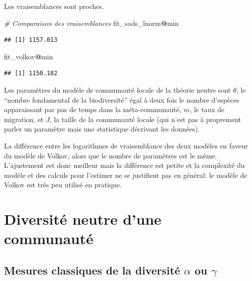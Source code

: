 \documentclass[
  11pt,
  american,
  a4paper,
  extrafontsizes,onecolumn,openright
  ]{memoir}
\newenvironment{Shaded}{\begin{snugshade}}{\end{snugshade}}
\newcommand{\CommentTok}[1]{\textcolor[rgb]{0.56,0.35,0.01}{\textit{#1}}}
\newcommand{\NormalTok}[1]{#1}
\newcommand{\SpecialCharTok}[1]{\textcolor[rgb]{0.81,0.36,0.00}{\textbf{#1}}}
\begin{document}
\normalsize

Les vraisemblances sont proches.

\scriptsize

\begin{Shaded}
\begin{Highlighting}[]
\CommentTok{\# Comparaison des vraisemblances}
\NormalTok{fit\_sads\_lnorm}\SpecialCharTok{@}\NormalTok{min}
\end{Highlighting}
\end{Shaded}

\begin{verbatim}
## [1] 1157.013
\end{verbatim}

\begin{Shaded}
\begin{Highlighting}[]
\NormalTok{fit\_volkov}\SpecialCharTok{@}\NormalTok{min}
\end{Highlighting}
\end{Shaded}

\begin{verbatim}
## [1] 1150.182
\end{verbatim}

\normalsize

Les paramètres du modèle de communauté locale de la théorie neutre sont \(\theta\), le \enquote{nombre fondamental de la biodiversité} égal à deux fois le nombre d'espèces apparaissant par pas de temps dans la méta-communauté, \(m\), le taux de migration, et \(J\), la taille de la communauté locale (qui n'est pas à proprement parler un paramètre mais une statistique décrivant les données).

La différence entre les logarithmes de vraisemblance des deux modèles en faveur du modèle de Volkov, alors que le nombre de paramètres est le même.
L'ajustement est donc meilleur mais la différence est petite et la complexité du modèle et des calculs pour l'estimer ne se justifient pas en général: le modèle de Volkov est très peu utilisé en pratique.

\part{Diversité neutre d'une communauté}\label{part-diversituxe9-neutre-dune-communautuxe9}

\chapter{\texorpdfstring{Mesures classiques de la diversité \(\alpha\) ou \(\gamma\)}{Mesures classiques de la diversité \textbackslash alpha ou \textbackslash gamma}}\label{chap-MesuresNeutres}
\end{document}
